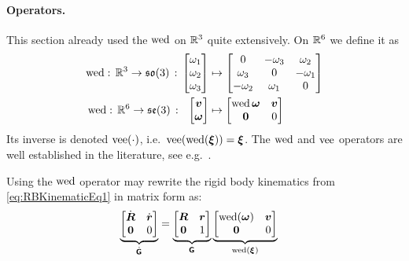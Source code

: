 \paragraph*{Operators.}
This section already used the $\operatorname{wed}$ on $\mathbb{R}^3$ quite extensively.
On $\mathbb{R}^6$ we define it as
\begin{subequations}\label{eq:DefWedgeOp}
\begin{align}
 \operatorname{wed} : \, \mathbb{R}^3 \rightarrow \mathfrak{so}(3) \, : \, \begin{bmatrix} \omega_1 \\ \omega_2 \\ \omega_3 \end{bmatrix} &\mapsto \begin{bmatrix} 0 & -\omega_3 & \omega_2 \\ \omega_3 & 0 & -\omega_1 \\ -\omega_2 & \omega_1 & 0 \end{bmatrix}
\\
 \operatorname{wed}: \, \mathbb{R}^6 \rightarrow \mathfrak{se}(3) \, : \ \ \begin{bmatrix} \boldsymbol{v} \\ \boldsymbol{\omega} \end{bmatrix} &\mapsto \begin{bmatrix} \operatorname{wed}\boldsymbol{\omega} & \boldsymbol{v} \\ \boldsymbol{0} & 0 \end{bmatrix}
\end{align}
\end{subequations}
Its inverse is denoted $\operatorname{vee}(\cdot)$, i.e.\ $\operatorname{vee}(\operatorname{wed}(\boldsymbol{\xi}))=\boldsymbol{\xi}$.
The $\operatorname{wed}$ and $\operatorname{vee}$ operators are well established in the literature, see e.g.\ \cite[sec.\ 2.3.2]{Murray:Robotic}.

Using the $\operatorname{wed}$ operator may rewrite the rigid body kinematics from \eqref{eq:RBKinematicEq1} in matrix form as:
\begin{align}
 \underbrace{\begin{bmatrix} \Rd & \rd \\ \mat{0} & 0 \end{bmatrix}}_{\dot{\G}} &= \underbrace{\begin{bmatrix} \R & \r \\ \mat{0} & 1 \end{bmatrix}}_{\G} \underbrace{\begin{bmatrix} \wedOp(\w) & \v \\ \mat{0} & 0 \end{bmatrix}}_{\wedOp(\bodyVel{}{})}
\end{align}

